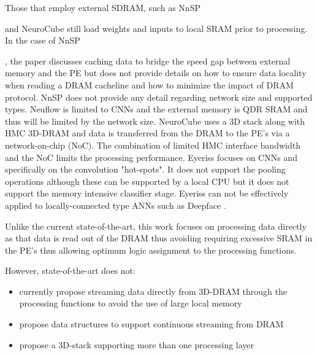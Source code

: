 Those that employ external SDRAM, such as NnSP{\cite{esmaeilzadeh2005nnsp} and NeuroCube\cite{kim2016neurocube} still 
load weights and inputs to local SRAM prior to processing.
In the case of NnSP{\cite{esmaeilzadeh2005nnsp}, the paper discusses caching data to bridge the speed gap between external memory and the PE 
but does not provide details on how to ensure data locality when reading a DRAM cacheline and how to minimize the impact of DRAM protocol.
NnSP does not provide any detail regarding network size and supported types.
Neuflow\cite{farabet2011neuflow} is limited to CNNs and the external memory is QDR SRAM 
and thus will be limited by the network size.
NeuroCube uses a 3D stack along with HMC 3D-DRAM and data is transferred from the DRAM to the PE's via a network-on-chip (NoC).
The combination of limited HMC interface bandwidth and the NoC limits the processing performance.
Eyeriss\cite{chen201614} focuses on CNNs and specifically on the convolution "hot-spots". It does not support the pooling operations although these can
be supported by a local CPU but it does not support the memory intensive classifier stage. 
Eyeriss can not be effectively applied to locally-connected type ANNs such as Deepface \cite{Taigman_2014_CVPR}.

\iftrue
Unlike the current state-of-the-art, this work focuses on processing data directly as that data is read out of the DRAM thus avoiding requiring excessive SRAM
in the PE's thus allowing optimum logic assignment to the processing functions.

However, state-of-the-art does not:
\vspace{-3mm}
\begin{itemize}
  \itemsep-1.5mm
  \item currently propose streaming data directly from 3D-DRAM through the processing functions to avoid the use of large local memory
  \item propose data structures to support continuous streaming from DRAM
  \item propose a 3D-stack supporting more than one processing layer
\end{itemize}

}}
